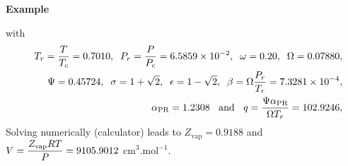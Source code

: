 \begin{MyExample}{\begin{center}{\bf Example}\end{center}}
\begin{enumerate}[a)]
\begin{displaymath}
                  \end{displaymath}
                  with
                  \begin{eqnarray}
                     && T_{r}=\displaystyle\frac{T}{T_{c}} = 0.7010,\;\;P_{r}=\displaystyle\frac{P}{P_{c}}=6.5859\times 10^{-2},\;\;\omega=0.20,\;\;\Omega = 0.07880, \nonumber \\
                     && \Psi = 0.45724,\;\; \sigma=1+\sqrt{2},\;\;\epsilon=1-\sqrt{2},\;\;\beta=\Omega\displaystyle\frac{P_{r}}{T_{r}}=7.3281\times 10^{-4},\nonumber \\
                     && \alpha_{\text{PR}} = 1.2308\;\;\text{ and }\;\; q = \displaystyle\frac{\Psi\alpha_{\text{PR}}}{\Omega T_{r}} = 102.9246, \nonumber 
                  \end{eqnarray}
                  Solving numerically (calculator) leads to $Z_{\text{vap}}=0.9188$ and $V=\displaystyle\frac{Z_{\text{vap}}RT}{P} = 9105.9012$ cm$^{3}$.mol$^{-1}$.
%
           \end{enumerate}
   \end{MyExample}


   

